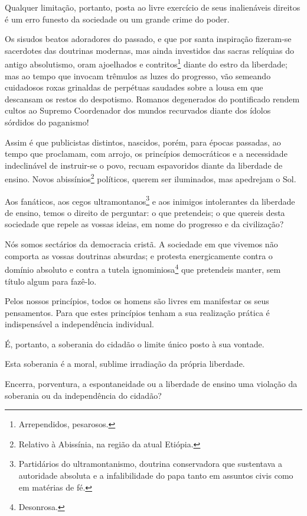 Qualquer limitação, portanto, posta ao livre exercício de seus
inalienáveis direitos é um erro funesto da sociedade ou um grande crime
do poder.

Os sisudos beatos adoradores do passado, e que por santa inspiração
fizeram-se sacerdotes das doutrinas modernas, mas ainda investidos das
sacras relíquias do antigo absolutismo, oram ajoelhados e
contritos\footnote{Arrependidos, pesarosos.} diante do estro da
liberdade; mas ao tempo que invocam trêmulos as luzes do progresso, vão
semeando cuidadosos roxas grinaldas de perpétuas saudades sobre a lousa
em que descansam os restos do despotismo. Romanos degenerados do
pontificado rendem cultos ao Supremo Coordenador dos mundos recurvados
diante dos ídolos sórdidos do paganismo!

Assim é que publicistas distintos, nascidos, porém, para épocas
passadas, ao tempo que proclamam, com arrojo, os princípios democráticos
e a necessidade indeclinável de instruir-se o povo, recuam espavoridos
diante da liberdade de ensino. Novos abissínios\footnote{Relativo à
  Abissínia, na região da atual Etiópia.} políticos, querem ser
iluminados, mas apedrejam o Sol.

Aos fanáticos, aos cegos ultramontanos\footnote{Partidários do
  ultramontanismo, doutrina conservadora que sustentava a autoridade
  absoluta e a infalibilidade do papa tanto em assuntos civis como em
  matérias de fé.} e aos inimigos intolerantes da liberdade de ensino,
temos o direito de perguntar: o que pretendeis; o que quereis desta
sociedade que repele as vossas ideias, em nome do progresso e da
civilização?

Nós somos sectários da democracia cristã. A sociedade em que vivemos não
comporta as vossas doutrinas absurdas; e protesta energicamente contra o
domínio absoluto e contra a tutela ignominiosa\footnote{Desonrosa.}
que pretendeis manter, sem título algum para fazê-lo.

Pelos nossos princípios, todos os homens são livres em manifestar os
seus pensamentos. Para que estes princípios tenham a sua realização
prática é indispensável a independência individual.

É, portanto, a soberania do cidadão o limite único posto à sua vontade.

Esta soberania é a moral, sublime irradiação da própria liberdade.

Encerra, porventura, a espontaneidade ou a liberdade de ensino uma
violação da soberania ou da independência do cidadão?

